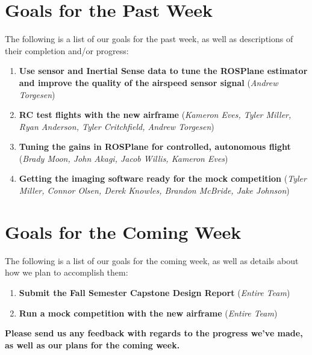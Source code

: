 \documentclass[]{../auvsi_doc}
\begin{document}
\section{Goals for the Past Week}

The following is a list of our goals for the past week, as well as descriptions of their completion and/or progress:

\begin{enumerate}
	\item \textbf{Use sensor and Inertial Sense data to tune the ROSPlane estimator and improve the quality of the airspeed sensor signal} (\textit{Andrew Torgesen})
	\item \textbf{RC test flights with the new airframe} (\textit{Kameron Eves, Tyler Miller, Ryan Anderson, Tyler Critchfield, Andrew Torgesen})
	\item \textbf{Tuning the gains in ROSPlane for controlled, autonomous flight} (\textit{Brady Moon, John Akagi, Jacob Willis, Kameron Eves})
	\item \textbf{Getting the imaging software ready for the mock competition} (\textit{Tyler Miller, Connor Olsen, Derek Knowles, Brandon McBride, Jake Johnson})
\end{enumerate}

\section{Goals for the Coming Week}

The following is a list of our goals for the coming week, as well as details about how we plan to accomplish them:

\begin{enumerate}
\item \textbf{Submit the Fall Semester Capstone Design Report} (\textit{Entire Team})
\item \textbf{Run a mock competition with the new airframe} (\textit{Entire Team})
\end{enumerate}

\textbf{Please send us any feedback with regards to the progress we've made, as well as our plans for the coming week.}
\end{document}
